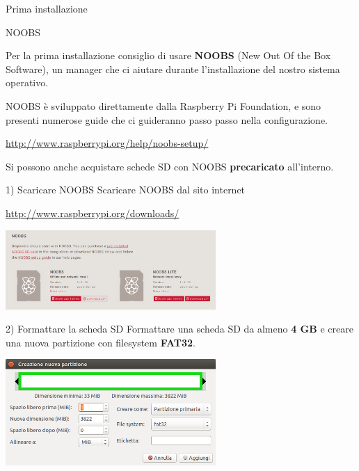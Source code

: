 \documentclass[xcolor=svgnames,11pt]{beamer}
\begin{document}
\begin{frame}{Prima installazione}
\begin{block}{NOOBS}

Per la prima installazione consiglio di usare \textbf{NOOBS} (New Out Of the Box Software), un manager che ci aiutare durante l'installazione del nostro sistema operativo.

\end{block}

\pause
\medskip

NOOBS \`e sviluppato direttamente dalla Raspberry Pi Foundation, e sono presenti numerose guide che ci guideranno passo passo nella configurazione.

\pause
\medskip
\begin{center}
\url{http://www.raspberrypi.org/help/noobs-setup/}
\end{center}

\pause
\medskip

Si possono anche acquistare schede SD con NOOBS \textbf{precaricato} all'interno.

\end{frame}

\begin{frame}{1) Scaricare NOOBS}
Scaricare NOOBS dal sito internet
\begin{center}
\url{http://www.raspberrypi.org/downloads/}

\bigskip
\includegraphics[width=8cm]{guide/1.png}

\end{center}
\end{frame}

\begin{frame}{2) Formattare la scheda SD}
Formattare una scheda SD da almeno \textbf{4 GB} e creare una nuova partizione con filesystem \textbf{FAT32}.

\bigskip
\begin{center}
\includegraphics[width=8cm]{guide/2.png}
\end{center}
\end{frame}
\end{document}
